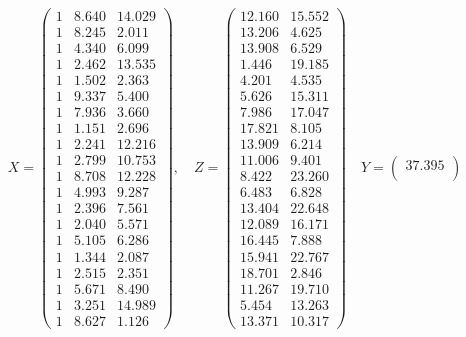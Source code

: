 \documentclass[10.5pt,notitlepage]{article}
\theoremstyle{plain}
\begin{document}
\begin{equation}\label{2.1}
X=\begin{pmatrix}
1 &8.640 &14.029  \\ 
 1& 8.245 &2.011\\
 1& 4.340 &6.099\\
 1& 2.462 &13.535\\
 1& 1.502 &2.363 \\
 1& 9.337 &5.400 \\
 1& 7.936 &3.660 \\
 1& 1.151 &2.696\\
1& 2.241 &12.216\\
 1& 2.799 &10.753\\
 1 &8.708 &12.228 \\
1& 4.993 &9.287 \\
1& 2.396 &7.561 \\
1& 2.040 &5.571\\
1& 5.105& 6.286\\
1& 1.344& 2.087\\
1& 2.515& 2.351\\
 1& 5.671& 8.490\\
1 &3.251& 14.989\\
1 &8.627& 1.126   
\end{pmatrix},\quad Z=\begin{pmatrix}
12.160 &15.552\\
13.206 &4.625\\  
13.908 &6.529\\
1.446 &19.185\\
4.201 &4.535\\
5.626 &15.311\\
7.986 &17.047\\
17.821 &8.105\\
13.909 &6.214\\  
11.006 &9.401\\ 
8.422 &23.260\\
6.483 &6.828\\
13.404 &22.648\\
12.089 &16.171\\
16.445 &7.888\\
15.941 &22.767\\
18.701 &2.846\\
11.267 &19.710\\
5.454 &13.263\\
13.371 &10.317
\end{pmatrix} \quad 
Y = \begin{pmatrix}
 37.395\\

\end{pmatrix}
\end{equation}
\end{document}
